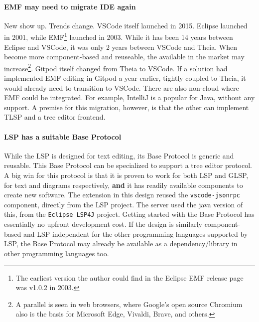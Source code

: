\paragraph{EMF may need to migrate IDE again}
New  show up.
Trends change.
\gls{VSCode} itself launched in 2015.
\gls{Eclipse} launched in 2001, while \acrshort{EMF}\footnote{The earliest version the author could find in the Eclipse EMF release page was v1.0.2 in 2003.} launched in 2003.
While it has been 14 years between \gls{Eclipse} and \gls{VSCode}, it was only 2 years between \gls{VSCode} and \gls{Theia}.
When  become more component-based and reuseable, the available  in the market may increase\footnote{A parallel is seen in web browsers, where Google's open source Chromium also is the basis for Microsoft Edge, Vivaldi, Brave, and others.}.
\gls{Gitpod} itself changed from \gls{Theia} to \gls{VSCode}.
If a solution had implemented \acrshort{EMF} editing in \gls{Gitpod} a year earlier, tightly coupled to \gls{Theia}, it would already need to transition to \gls{VSCode}.
There are also non-cloud  where \acrshort{EMF} could be integrated.
For example, IntelliJ is a popular  for Java, without any  support.
A premise for this migration, however, is that the other  can implement \acrshort{TLSP} and a tree editor frontend.

\paragraph{LSP has a suitable Base Protocol}
While the \acrlong{LSP} is designed for text editing, its Base Protocol is generic and reusable.
This Base Protocol can be specialized to support a tree editor protocol.
A big win for this protocol is that it is proven to work for both \acrshort{LSP} and \acrshort{GLSP}, for text and diagrams respectively, \textbf{and} it has readily available components to create new software.
The extension in this design reused the \texttt{vscode-jsonrpc} component, directly from the \acrshort{LSP} project.
The server used the java version of this, from the \texttt{Eclipse LSP4J} project.
Getting started with the Base Protocol has essentially no upfront development cost.
If the design is similarly component-based and \acrshort{LSP} independent for the other programming languages supported by \acrshort{LSP}, the Base Protocol may already be available as a dependency/library in other programming languages too.\\

